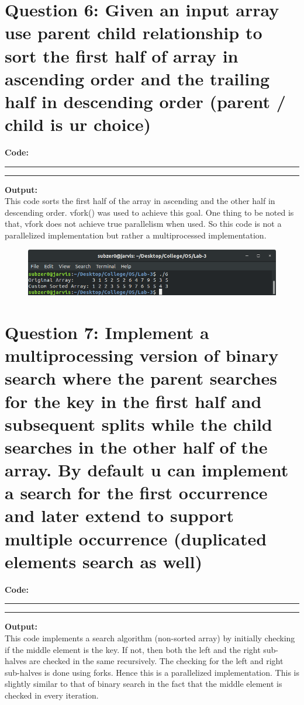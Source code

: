 \documentclass{article}
\begin{document}
\section*{Question 6: Given an input array use parent child relationship to sort the first half of array in ascending order and the trailing half in descending order (parent / child is ur choice)}

\bigskip

\textbf{\LARGE Code:}
\smallskip
\par\noindent\rule{\textwidth}{0.4pt}

\par\noindent\rule{\textwidth}{0.4pt}

\bigskip
\noindent
\textbf{\LARGE Output:}
\bigskip \\This code sorts the first half of the array in ascending and the
other half in descending order. vfork() was used to achieve this goal. One
thing to be noted is that, vfork does not achieve true parallelism when used.
So this code is not a parallelized implementation but rather a multiprocessed
implementation.
\begin{figure}[ht]
    \includegraphics[width=\textwidth]{output/6.png}
\end{figure}

\section*{Question 7: Implement a multiprocessing version of binary search where the parent searches for the key in the first half and subsequent splits while the child searches in the other half of the array. By default u can implement a search for the first occurrence and later extend to support multiple occurrence (duplicated elements search as well)}

\bigskip

\textbf{\LARGE Code:}
\smallskip
\par\noindent\rule{\textwidth}{0.4pt}

\par\noindent\rule{\textwidth}{0.4pt}

\bigskip
\noindent
\textbf{\LARGE Output:}
\bigskip \\This code implements a search algorithm (non-sorted array) by initially checking if the
middle element is the key. If not, then both the left and the right sub-halves are checked in the same
recursively. The checking for the left and right sub-halves is done using forks. Hence this is a parallelized
implementation. This is slightly similar to that of binary search in the fact that the middle element
is checked in every iteration.
\end{document}

